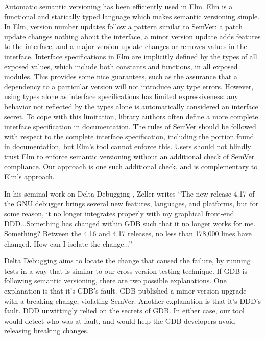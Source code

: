 Automatic semantic versioning has been efficiently used in Elm. Elm is a
functional and statically typed language which makes semantic versioning
simple. In Elm, version number updates follow a pattern similar to
SemVer: a patch update changes nothing about the interface, a minor
version update adds features to the interface, and a major version
update changes or removes values in the interface. Interface
specifications in Elm are implicitly defined by the types of all exposed
values, which include both constants and functions, in all exposed
modules. This provides some nice guarantees, such as the assurance that
a dependency to a particular version will not introduce any type errors.
However, using types alone as interface specifications has limited
expressiveness: any behavior not reflected by the types alone is
automatically considered an interface secret. To cope with this limitation,
library authors often define a more complete interface specification in
documentation. The rules of SemVer should be followed with respect to
the complete interface specification, including the portion found in
documentation, but Elm's tool cannot enforce this. Users should not
blindly trust Elm to enforce semantic versioning without an additional
check of SemVer compliance. Our approach is one such additional check,
and is complementary to Elm's approach.

In his seminal work on Delta Debugging \cite{zeller}, Zeller writes
``The new release 4.17 of the GNU debugger brings several new features,
languages, and platforms, but for some reason, it no longer integrates
properly with my graphical front-end DDD...Something has changed within
GDB such that it no longer works for me. Something?  Between the 4.16
and 4.17 releases, no less than 178,000 lines have changed. How can I
isolate the change...''

Delta Debugging aims to locate the change that caused the failure, by
running tests in a way that is similar to our cross-version testing
technique. If GDB is following semantic versioning, there are two
possible explanations. One explanation is that it's GDB's fault. GDB
published a minor version upgrade with a breaking change, violating
SemVer. Another explanation is that it's DDD's fault. DDD unwittingly
relied on the secrets of GDB. In either case, our tool would detect
who was at fault, and would help the GDB developers avoid releasing
breaking changes.


